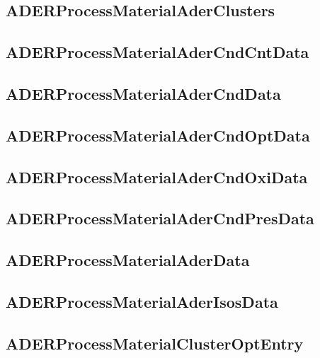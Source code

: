 \subsection{ADERProcessMaterialAderClusters}


\subsection{ADERProcessMaterialAderCndCntData}


\subsection{ADERProcessMaterialAderCndData}


\subsection{ADERProcessMaterialAderCndOptData}


\subsection{ADERProcessMaterialAderCndOxiData}


\subsection{ADERProcessMaterialAderCndPresData}


\subsection{ADERProcessMaterialAderData}


\subsection{ADERProcessMaterialAderIsosData}


\subsection{ADERProcessMaterialClusterOptEntry}


